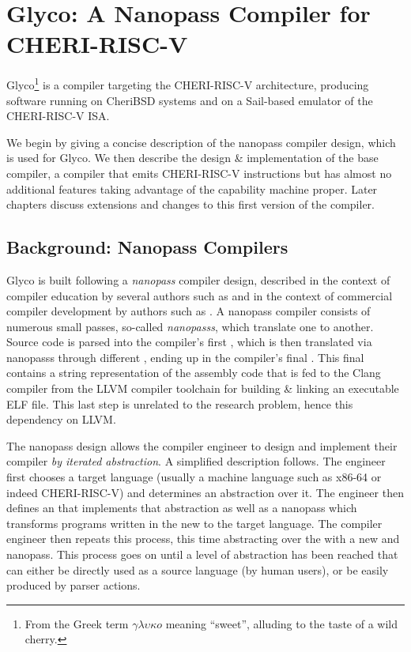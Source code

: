 \documentclass[main.tex]{subfiles}
\begin{document}
\onlyinsubfile{\mainmatter{}}

\chapter{Glyco: A Nanopass Compiler for CHERI-RISC-V}

Glyco\footnote{From the Greek term $\gamma\lambda\upsilon\kappa{}o$ meaning \enquote{sweet}, alluding to the taste of a wild cherry.} is a compiler targeting the CHERI-RISC-V architecture, producing software running on CheriBSD systems and on a Sail-based emulator of the CHERI-RISC-V ISA.

We begin by giving a concise description of the nanopass compiler design, which is used for Glyco. We then describe the design \& implementation of the base compiler, a compiler that emits CHERI-RISC-V instructions but has almost no additional features taking advantage of the capability machine proper. Later chapters discuss extensions and changes to this first version of the compiler.

\section{Background: Nanopass Compilers}
Glyco is built following a \emph{nanopass} compiler design, described in the context of compiler education by several authors such as \cite{educomp} and in the context of commercial compiler development by authors such as \cite{commcomp}. A nanopass compiler consists of numerous small passes, so-called \emph{\glspl{nanopass}}, which translate one \emph{\il{}} to another. Source code is parsed into the compiler’s first \il{}, which is then translated via \glspl{nanopass} through different \ils{}, ending up in the compiler's final \il{}. This final \il{} contains a string representation of the assembly code that is fed to the Clang compiler from the LLVM compiler toolchain for building \& linking an executable ELF file. This last step is unrelated to the research problem, hence this dependency on LLVM.

The nanopass design allows the compiler engineer to design and implement their compiler \emph{by iterated abstraction}. A simplified description follows. The engineer first chooses a target language (usually a machine language such as x86-64 or indeed CHERI-RISC-V) and determines an abstraction over it. The engineer then defines an \il{} that implements that abstraction as well as a \gls{nanopass} which transforms programs written in the new \il{} to the target language. The compiler engineer then repeats this process, this time abstracting over the \il{} with a new \il{} and \gls{nanopass}. This process goes on until a level of abstraction has been reached that can either be directly used as a source language (by human users), or be easily produced by parser actions.
\end{document}
